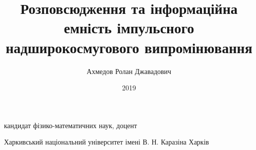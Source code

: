 \documentclass{vakthesis}
\theoremstyle{plain}
\theoremstyle{definition}
\theoremstyle{remark}
\begin{document}

\title{Розповсюдження та інформаційна емність імпульсного 
надширокосмугового випромінювання}

\author{Ахмедов Ролан Джавадович}

{кандидат фізико-математичних наук, доцент}



\institution
{Харкивський національний університет імені В. Н. Каразіна}
{Харків}

\date{2019}

\maketitle

\tableofcontents










\appendix




\end{document}
